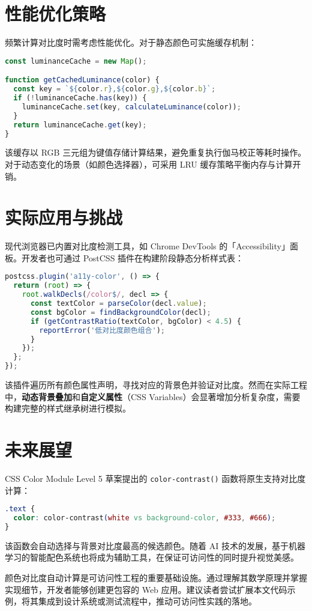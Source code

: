 \chapter{性能优化策略}
频繁计算对比度时需考虑性能优化。对于静态颜色可实施缓存机制：\par
\begin{lstlisting}[language=javascript]
const luminanceCache = new Map();

function getCachedLuminance(color) {
  const key = `${color.r},${color.g},${color.b}`;
  if (!luminanceCache.has(key)) {
    luminanceCache.set(key, calculateLuminance(color));
  }
  return luminanceCache.get(key);
}
\end{lstlisting}
该缓存以 RGB 三元组为键值存储计算结果，避免重复执行伽马校正等耗时操作。对于动态变化的场景（如颜色选择器），可采用 LRU 缓存策略平衡内存与计算开销。\par
\chapter{实际应用与挑战}
现代浏览器已内置对比度检测工具，如 Chrome DevTools 的「Accessibility」面板。开发者也可通过 PostCSS 插件在构建阶段静态分析样式表：\par
\begin{lstlisting}[language=javascript]
postcss.plugin('a11y-color', () => {
  return (root) => {
    root.walkDecls(/color$/, decl => {
      const textColor = parseColor(decl.value);
      const bgColor = findBackgroundColor(decl);
      if (getContrastRatio(textColor, bgColor) < 4.5) {
        reportError('低对比度颜色组合');
      }
    });
  };
});
\end{lstlisting}
该插件遍历所有颜色属性声明，寻找对应的背景色并验证对比度。然而在实际工程中，\textbf{动态背景叠加}和\textbf{自定义属性}（CSS Variables）会显著增加分析复杂度，需要构建完整的样式继承树进行模拟。\par
\chapter{未来展望}
CSS Color Module Level 5 草案提出的 \verb!color-contrast()! 函数将原生支持对比度计算：\par
\begin{lstlisting}[language=css]
.text {
  color: color-contrast(white vs background-color, #333, #666);
}
\end{lstlisting}
该函数会自动选择与背景对比度最高的候选颜色。随着 AI 技术的发展，基于机器学习的智能配色系统也将成为辅助工具，在保证可访问性的同时提升视觉美感。\par
颜色对比度自动计算是可访问性工程的重要基础设施。通过理解其数学原理并掌握实现细节，开发者能够创建更包容的 Web 应用。建议读者尝试扩展本文代码示例，将其集成到设计系统或测试流程中，推动可访问性实践的落地。\par
